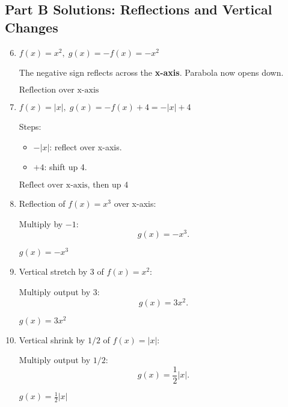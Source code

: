 \documentclass[12pt]{article}
\begin{document}
\subsection*{Part B Solutions: Reflections and Vertical Changes}
\begin{enumerate}
  \setcounter{enumi}{5}
  \item \(f(x) = x^2,\; g(x) = -f(x) = -x^2\)

  The negative sign reflects across the \textbf{x-axis}. Parabola now opens down.

  \(\boxed{\text{Reflection over x-axis}}\)

  \item \(f(x) = |x|,\; g(x) = -f(x) + 4 = -|x| + 4\)

  Steps:
  \begin{itemize}
    \item \(-|x|\): reflect over x-axis.
    \item \(+4\): shift up 4.
  \end{itemize}

  \(\boxed{\text{Reflect over x-axis, then up 4}}\)

  \item Reflection of \(f(x) = x^3\) over x-axis:

  Multiply by \(-1\):
  \[
  g(x) = -x^3.
  \]

  \(\boxed{g(x) = -x^3}\)

  \item Vertical stretch by 3 of \(f(x) = x^2\):

  Multiply output by 3:
  \[
  g(x) = 3x^2.
  \]

  \(\boxed{g(x) = 3x^2}\)

  \item Vertical shrink by \(1/2\) of \(f(x) = |x|\):

  Multiply output by \(1/2\):
  \[
  g(x) = \frac{1}{2}|x|.
  \]

  \(\boxed{g(x) = \tfrac{1}{2}|x|}\)
\end{enumerate}
\end{document}
